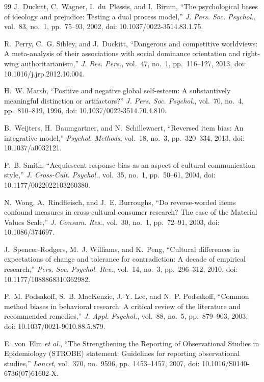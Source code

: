 \documentclass[journal,a4paper]{IEEEtran}
\begin{document}
\begin{thebibliography}{99}
J.~Duckitt, C.~Wagner, I.~du~Plessis, and I.~Birum, ``The psychological bases of ideology and prejudice: Testing a dual process model,'' \emph{J. Pers. Soc. Psychol.}, vol.~83, no.~1, pp.~75--93, 2002, doi: 10.1037/0022-3514.83.1.75.

R.~Perry, C.~G. Sibley, and J.~Duckitt, ``Dangerous and competitive worldviews: A meta-analysis of their associations with social dominance orientation and right-wing authoritarianism,'' \emph{J. Res. Pers.}, vol.~47, no.~1, pp.~116--127, 2013, doi: 10.1016/j.jrp.2012.10.004.

H.~W. Marsh, ``Positive and negative global self-esteem: A substantively meaningful distinction or artifactors?'' \emph{J. Pers. Soc. Psychol.}, vol.~70, no.~4, pp.~810--819, 1996, doi: 10.1037/0022-3514.70.4.810.

B.~Weijters, H.~Baumgartner, and N.~Schillewaert, ``Reversed item bias: An integrative model,'' \emph{Psychol. Methods}, vol.~18, no.~3, pp.~320--334, 2013, doi: 10.1037/a0032121.

P.~B. Smith, ``Acquiescent response bias as an aspect of cultural communication style,'' \emph{J. Cross-Cult. Psychol.}, vol.~35, no.~1, pp.~50--61, 2004, doi: 10.1177/0022022103260380.

N.~Wong, A.~Rindfleisch, and J.~E. Burroughs, ``Do reverse-worded items confound measures in cross-cultural consumer research? The case of the Material Values Scale,'' \emph{J. Consum. Res.}, vol.~30, no.~1, pp.~72--91, 2003, doi: 10.1086/374697.

J.~Spencer-Rodgers, M.~J. Williams, and K.~Peng, ``Cultural differences in expectations of change and tolerance for contradiction: A decade of empirical research,'' \emph{Pers. Soc. Psychol. Rev.}, vol.~14, no.~3, pp.~296--312, 2010, doi: 10.1177/1088868310362982.

P.~M. Podsakoff, S.~B. MacKenzie, J.-Y. Lee, and N.~P. Podsakoff, ``Common method biases in behavioral research: A critical review of the literature and recommended remedies,'' \emph{J. Appl. Psychol.}, vol.~88, no.~5, pp.~879--903, 2003, doi: 10.1037/0021-9010.88.5.879.

E.~von~Elm \emph{et al.}, ``The Strengthening the Reporting of Observational Studies in Epidemiology (STROBE) statement: Guidelines for reporting observational studies,'' \emph{Lancet}, vol.~370, no.~9596, pp.~1453--1457, 2007, doi: 10.1016/S0140-6736(07)61602-X.


\end{thebibliography}
\end{document}
